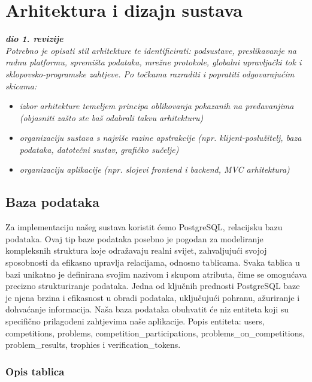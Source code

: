 \chapter{Arhitektura i dizajn sustava}
		
		\textbf{\textit{dio 1. revizije}}\\

		\textit{ Potrebno je opisati stil arhitekture te identificirati: podsustave, preslikavanje na radnu platformu, spremišta podataka, mrežne protokole, globalni upravljački tok i sklopovsko-programske zahtjeve. Po točkama razraditi i popratiti odgovarajućim skicama:}
	\begin{itemize}
		\item 	\textit{izbor arhitekture temeljem principa oblikovanja pokazanih na predavanjima (objasniti zašto ste baš odabrali takvu arhitekturu)}
		\item 	\textit{organizaciju sustava s najviše razine apstrakcije (npr. klijent-poslužitelj, baza podataka, datotečni sustav, grafičko sučelje)}
		\item 	\textit{organizaciju aplikacije (npr. slojevi frontend i backend, MVC arhitektura) }		
	\end{itemize}

	
		

		

				
		\section{Baza podataka}
			
		Za implementaciju našeg sustava koristit ćemo PostgreSQL, relacijsku bazu podataka. Ovaj tip baze podataka posebno je pogodan za modeliranje kompleksnih struktura koje odražavaju realni svijet, zahvaljujući svojoj sposobnosti da efikasno upravlja relacijama, odnosno tablicama. Svaka tablica u bazi unikatno je definirana svojim nazivom i skupom atributa, čime se omogućava precizno strukturiranje podataka. Jedna od ključnih prednosti PostgreSQL baze je njena brzina i efikasnost u obradi podataka, uključujući pohranu, ažuriranje i dohvaćanje informacija. Naša baza podataka obuhvatit će niz entiteta koji su specifično prilagođeni zahtjevima naše aplikacije.
		Popis entiteta: users, competitions, problems, competition_participations, problems_on_competitions, problem_results, trophies i verification_tokens.
			\subsection{Opis tablica}
			

